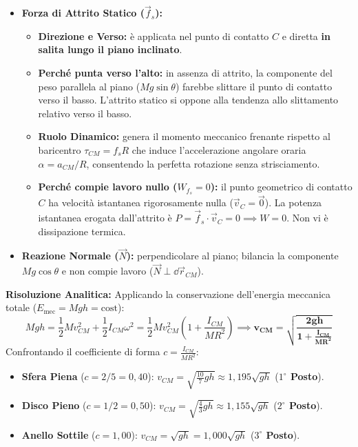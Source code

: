 \begin{tcolorbox}[enhanced, breakable, colback=forestgreen!5!white, colframe=forestgreen!80!black,
    title={\textbf{Analisi delle Forze in Gioco nel Puro Rotolamento}}, fonttitle=\bfseries\sffamily]
\begin{itemize}
    \item \textbf{Forza di Attrito Statico ($\vec{f}_s$):}
    \begin{itemize}
        \item \textbf{Direzione e Verso:} è applicata nel punto di contatto $C$ e diretta \textbf{in salita lungo il piano inclinato}.
        \item \textbf{Perché punta verso l'alto:} in assenza di attrito, la componente del peso parallela al piano ($Mg\sin\theta$) farebbe slittare il punto di contatto verso il basso. L'attrito statico si oppone alla tendenza allo slittamento relativo verso il basso.
        \item \textbf{Ruolo Dinamico:} genera il momento meccanico frenante rispetto al baricentro $\tau_{CM} = f_s R$ che induce l'accelerazione angolare oraria $\alpha = a_{CM}/R$, consentendo la perfetta rotazione senza strisciamento.
        \item \textbf{Perché compie lavoro nullo ($W_{f_s} = 0$):} il punto geometrico di contatto $C$ ha velocità istantanea rigorosamente nulla ($\vec{v}_C = \vec{0}$). La potenza istantanea erogata dall'attrito è $P = \vec{f}_s\cdot\vec{v}_C = 0 \implies W = 0$. Non vi è dissipazione termica.
    \end{itemize}
    \item \textbf{Reazione Normale ($\vec{N}$):} perpendicolare al piano; bilancia la componente $Mg\cos\theta$ e non compie lavoro ($\vec{N}\perp\dd\vec{r}_{CM}$).
\end{itemize}
\end{tcolorbox}

\textbf{Risoluzione Analitica:}
Applicando la conservazione dell'energia meccanica totale ($E_{\text{mec}} = Mgh = \text{cost}$):
\begin{equation}
    Mgh = \frac{1}{2}M v_{CM}^2 + \frac{1}{2}I_{CM}\omega^2 = \frac{1}{2}M v_{CM}^2\left(1 + \frac{I_{CM}}{MR^2}\right) \implies \mathbf{v_{CM} = \sqrt{\frac{2gh}{1 + \frac{I_{CM}}{MR^2}}}}
\end{equation}
Confrontando il coefficiente di forma $c = \frac{I_{CM}}{MR^2}$:
\begin{itemize}
    \item \textbf{Sfera Piena} ($c = 2/5 = 0{,}40$): $v_{CM} = \sqrt{\frac{10}{7}gh} \approx 1{,}195\sqrt{gh}$ (\textbf{$1^\circ$ Posto}).
    \item \textbf{Disco Pieno} ($c = 1/2 = 0{,}50$): $v_{CM} = \sqrt{\frac{4}{3}gh} \approx 1{,}155\sqrt{gh}$ (\textbf{$2^\circ$ Posto}).
    \item \textbf{Anello Sottile} ($c = 1{,}00$): $v_{CM} = \sqrt{gh} = 1{,}000\sqrt{gh}$ (\textbf{$3^\circ$ Posto}).
\end{itemize}

